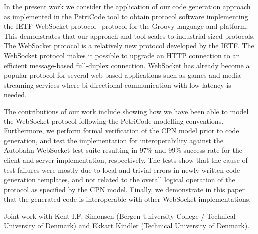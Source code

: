 \documentclass{llncs}
\begin{document}

In the present work we consider the application of our code generation 
approach as
implemented in the PetriCode tool to obtain protocol software
implementing the IETF WebSocket protocol~\cite{fette2011websocket}
protocol for the Groovy language and platform. This demonstrates that
our approach and tool scales to industrial-sized protocols. The
WebSocket protocol is a relatively new protocol %
developed by the IETF. The WebSocket protocol makes it possible to
upgrade an HTTP connection to an efficient message-based full-duplex
connection.  WebSocket has already become a popular protocol for
several web-based applications such as games and media streaming services
where bi-directional communication with low latency is needed.

The contributions of our work include showing how we have been able to
model the WebSocket protocol following the PetriCode modelling
conventions. Furthermore, we perform formal verification of the CPN
model prior to code generation, and test the implementation for
interoperability against the Autobahn WebSocket test-suite
\cite{Autobahn} resulting in 97\% and 99\% success rate for the client
and server implementation, respectively. The tests show that the cause
of test failures were mostly due to local and trivial errors in newly
written code-generation templates, and not related to the overall
logical operation of the protocol as specified by the CPN
model. Finally, we demonstrate in this paper that the generated code
is interoperable with other WebSocket implementations.
  
Joint work with Kent I.F. Simonsen (Bergen University College /
Technical University of Denmark) and Ekkart Kindler (Technical
University of Denmark).



\end{document}

